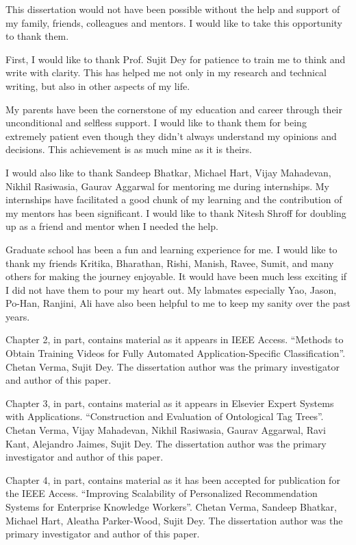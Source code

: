 \documentclass[12pt]{ucsddissertation}
\begin{document}
\begin{acknowledgements}


This dissertation would not have been possible without the help and support of my family, friends, colleagues and mentors. I would like to take this opportunity to thank them. 


First, I would like to thank Prof. Sujit Dey for patience to train me to think and write with clarity. This has helped me not only in my research and technical writing, but also in other aspects of my life. 

My parents have been the cornerstone of my education and career through their unconditional and selfless support. I would like to thank them for being extremely patient even though they didn’t always understand my opinions and decisions. This achievement is as much mine as it is theirs. 

I would also like to thank Sandeep Bhatkar, Michael Hart, Vijay Mahadevan, Nikhil Rasiwasia, Gaurav Aggarwal for mentoring me during internships. My internships have facilitated a good chunk of my learning and the contribution of my mentors has been significant. I would like to thank Nitesh Shroff for doubling up as a friend and mentor when I needed the help. 

Graduate school has been a fun and learning experience for me. I would like to thank my friends Kritika, Bharathan, Rishi, Manish, Ravee, Sumit, and many others for making the journey enjoyable. It would have been much less exciting if I did not have them to pour my heart out. My labmates especially Yao, Jason, Po-Han, Ranjini, Ali have also been helpful to me to keep my sanity over the past years.  


Chapter 2, in part, contains material as it appears in IEEE Access. ``Methods to Obtain Training Videos for Fully Automated Application-Specific Classification''. Chetan Verma, Sujit Dey. The dissertation author was the primary investigator and author of this paper. 

Chapter 3, in part, contains material as it appears in Elsevier Expert Systems with Applications. ``Construction and Evaluation of Ontological Tag Trees''. Chetan Verma, Vijay Mahadevan, Nikhil Rasiwasia, Gaurav Aggarwal, Ravi Kant, Alejandro Jaimes, Sujit Dey. The dissertation author was the primary investigator and author of this paper. 

Chapter 4, in part, contains material as it has been accepted for publication for the IEEE Access. ``Improving Scalability of Personalized Recommendation Systems for Enterprise Knowledge Workers''. Chetan Verma, Sandeep Bhatkar, Michael Hart, Aleatha Parker-Wood, Sujit Dey. The dissertation author was the primary investigator and author of this paper. 

\end{acknowledgements}
\end{document}
